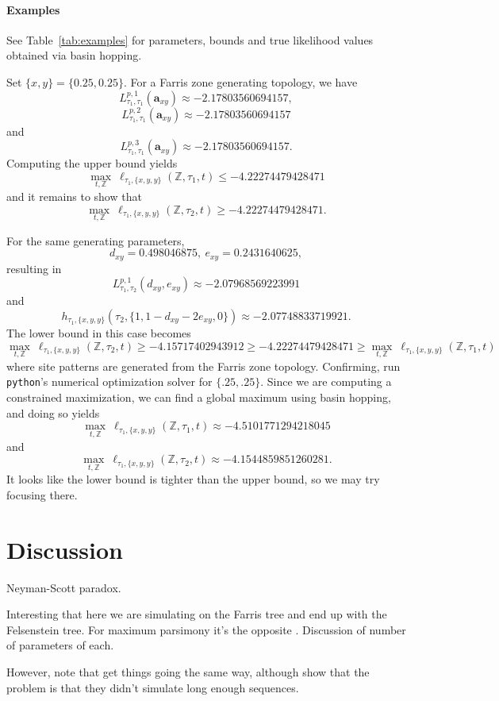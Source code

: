 \documentclass[a4paper]{article}
\newcommand{\fullAncestralStateCategories}{\mathbb{Z}}
\begin{document}
\paragraph{Examples}

See Table~\ref{tab:examples} for parameters, bounds and true likelihood values obtained via basin hopping.

Set $\{x, y\} = \{0.25, 0.25\}$.
For a Farris zone generating topology, we have
$$
L^{p,1}_{\tau_1,\tau_1}(\mathbf{a}_{xy}) \approx -2.17803560694157,
$$
$$
L^{p,2}_{\tau_1,\tau_1}(\mathbf{a}_{xy}) \approx -2.17803560694157
$$
and
$$
L^{p,3}_{\tau_1,\tau_1}(\mathbf{a}_{xy}) \approx -2.17803560694157.
$$
Computing the upper bound yields
$$
\max_{t,\fullAncestralStateCategories} \ \ell_{\tau_1,\{x,y,y\}}(\fullAncestralStateCategories,\tau_1,t) \le -4.22274479428471
$$
and it remains to show that
$$
\max_{t,\fullAncestralStateCategories} \ \ell_{\tau_1,\{x,y,y\}}(\fullAncestralStateCategories,\tau_2,t) \ge -4.22274479428471.
$$

For the same generating parameters,
$$
d_{xy} = 0.498046875, \ e_{xy} = 0.2431640625,
$$
resulting in
$$
L^{p,1}_{\tau_1,\tau_2}(d_{xy},e_{xy}) \approx -2.07968569223991
$$
and
$$
h_{\tau_1,\{x,y,y\}}(\tau_2,\{1, 1-d_{xy}-2e_{xy}, 0\}) \approx -2.07748833719921.
$$
The lower bound in this case becomes
$$
\max_{t,\fullAncestralStateCategories} \ \ell_{\tau_1,\{x,y,y\}}(\fullAncestralStateCategories,\tau_2,t) \ge -4.15717402943912
\ge -4.22274479428471 \ge \max_{t,\fullAncestralStateCategories} \ \ell_{\tau_1,\{x,y,y\}}(\fullAncestralStateCategories,\tau_1,t)
$$
where site patterns are generated from the Farris zone topology.
Confirming, run \texttt{python}'s numerical optimization solver for $\{.25, .25\}$.
Since we are computing a constrained maximization, we can find a global maximum using basin hopping, and doing so yields
$$
\max_{t,\fullAncestralStateCategories} \ \ell_{\tau_1,\{x,y,y\}}(\fullAncestralStateCategories,\tau_1,t) \approx -4.5101771294218045
$$
and
$$
\max_{t,\fullAncestralStateCategories} \ \ell_{\tau_1,\{x,y,y\}}(\fullAncestralStateCategories,\tau_2,t) \approx -4.1544859851260281.
$$
It looks like the lower bound is tighter than the upper bound, so we may try focusing there.

\section{Discussion}

Neyman-Scott paradox.

Interesting that here we are simulating on the Farris tree and end up with the Felsenstein tree.
For maximum parsimony it's the opposite \cite{Felsenstein1978-rr}.
Discussion of number of parameters of each.

However, note that \cite{Siddall1998-hq} get things going the same way, although \cite{Swofford2001-hr} show that the problem is that they didn't simulate long enough sequences.



\end{document}
